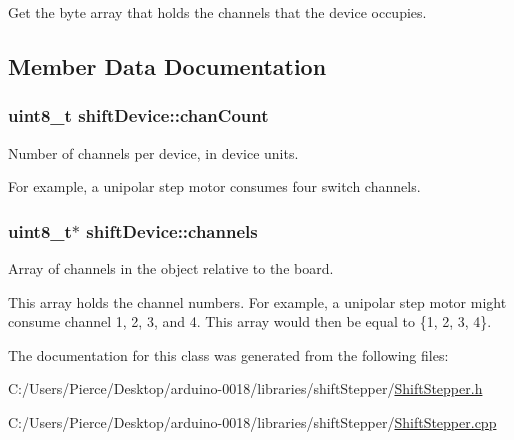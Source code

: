 Get the byte array that holds the channels that the device occupies. 



\subsection{Member Data Documentation}
\hypertarget{classshift_device_a8eed8391ef608036d0f55f42348c0e41}{
\subsubsection[{chanCount}]{\setlength{\rightskip}{0pt plus 5cm}uint8\_\-t {\bf shiftDevice::chanCount}}}
\label{classshift_device_a8eed8391ef608036d0f55f42348c0e41}


Number of channels per device, in device units. 

For example, a unipolar step motor consumes four switch channels. \hypertarget{classshift_device_ac63a0543346c357134fd207a47976bab}{
\subsubsection[{channels}]{\setlength{\rightskip}{0pt plus 5cm}uint8\_\-t$\ast$ {\bf shiftDevice::channels}}}
\label{classshift_device_ac63a0543346c357134fd207a47976bab}


Array of channels in the object relative to the board. 

This array holds the channel numbers. For example, a unipolar step motor might consume channel 1, 2, 3, and 4. This array would then be equal to \{1, 2, 3, 4\}. 

The documentation for this class was generated from the following files:\begin{DoxyCompactItemize}
\item 
C:/Users/Pierce/Desktop/arduino-\/0018/libraries/shiftStepper/\hyperlink{_shift_stepper_8h}{ShiftStepper.h}\item 
C:/Users/Pierce/Desktop/arduino-\/0018/libraries/shiftStepper/\hyperlink{_shift_stepper_8cpp}{ShiftStepper.cpp}\end{DoxyCompactItemize}
